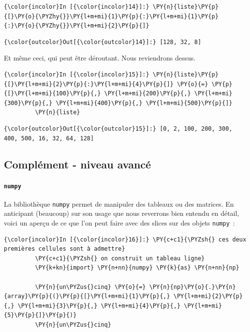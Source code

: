     \begin{Verbatim}[commandchars=\\\{\}]
{\color{incolor}In [{\color{incolor}14}]:} \PY{n}{liste}\PY{p}{[}\PY{o}{\PYZhy{}}\PY{l+m+mi}{1}\PY{p}{:}\PY{l+m+mi}{1}\PY{p}{:}\PY{o}{\PYZhy{}}\PY{l+m+mi}{2}\PY{p}{]}
\end{Verbatim}


\begin{Verbatim}[commandchars=\\\{\}]
{\color{outcolor}Out[{\color{outcolor}14}]:} [128, 32, 8]
\end{Verbatim}
            
    Et même ceci, qui peut être déroutant. Nous reviendrons dessus.

    \begin{Verbatim}[commandchars=\\\{\}]
{\color{incolor}In [{\color{incolor}15}]:} \PY{n}{liste}\PY{p}{[}\PY{l+m+mi}{2}\PY{p}{:}\PY{l+m+mi}{4}\PY{p}{]} \PY{o}{=} \PY{p}{[}\PY{l+m+mi}{100}\PY{p}{,} \PY{l+m+mi}{200}\PY{p}{,} \PY{l+m+mi}{300}\PY{p}{,} \PY{l+m+mi}{400}\PY{p}{,} \PY{l+m+mi}{500}\PY{p}{]}
         \PY{n}{liste}
\end{Verbatim}


\begin{Verbatim}[commandchars=\\\{\}]
{\color{outcolor}Out[{\color{outcolor}15}]:} [0, 2, 100, 200, 300, 400, 500, 16, 32, 64, 128]
\end{Verbatim}
            
    \hypertarget{compluxe9ment---niveau-avancuxe9}{%
\subsection{Complément - niveau
avancé}\label{compluxe9ment---niveau-avancuxe9}}

    \hypertarget{numpy}{%
\paragraph{\texorpdfstring{\texttt{numpy}}{numpy}}\label{numpy}}

    La bibliothèque \texttt{numpy} permet de manipuler des tableaux ou des
matrices. En anticipant (beaucoup) sur son usage que nous reverrons bien
entendu en détail, voici un aperçu de ce que l'on peut faire avec des
slices sur des objets \texttt{numpy}~:

    \begin{Verbatim}[commandchars=\\\{\}]
{\color{incolor}In [{\color{incolor}16}]:} \PY{c+c1}{\PYZsh{} ces deux premières cellules sont à admettre}
         \PY{c+c1}{\PYZsh{} on construit un tableau ligne}
         \PY{k+kn}{import} \PY{n+nn}{numpy} \PY{k}{as} \PY{n+nn}{np}
         
         \PY{n}{un\PYZus{}cinq} \PY{o}{=} \PY{n}{np}\PY{o}{.}\PY{n}{array}\PY{p}{(}\PY{p}{[}\PY{l+m+mi}{1}\PY{p}{,} \PY{l+m+mi}{2}\PY{p}{,} \PY{l+m+mi}{3}\PY{p}{,} \PY{l+m+mi}{4}\PY{p}{,} \PY{l+m+mi}{5}\PY{p}{]}\PY{p}{)}
         \PY{n}{un\PYZus{}cinq}
\end{Verbatim}


